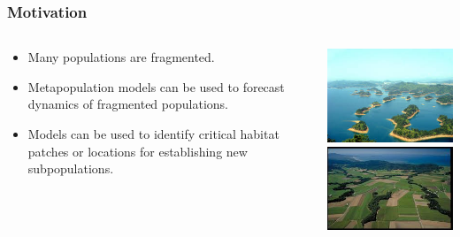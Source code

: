 \documentclass[color=usenames,dvipsnames]{beamer}\usepackage[]{graphicx}\usepackage[]{xcolor}
\begin{document}
\begin{frame}
  \frametitle{Motivation}
  \large
  \begin{columns}
    \begin{column}{0.6\textwidth}
      \begin{itemize}[<+->]
        \item Many populations are fragmented.
        \item Metapopulation models can be used to forecast dynamics of
          fragmented populations.
        \item Models can be used to identify critical habitat patches or
          locations for establishing new subpopulations.
      \end{itemize}
    \end{column}
    \begin{column}{0.4\textwidth}
      \includegraphics[width=\textwidth]{figs/ping-ding} \\
      \vspace{1cm}
      \includegraphics[width=\textwidth]{figs/fragmentation} \par
    \end{column}
  \end{columns}
\end{frame}
\end{document}
